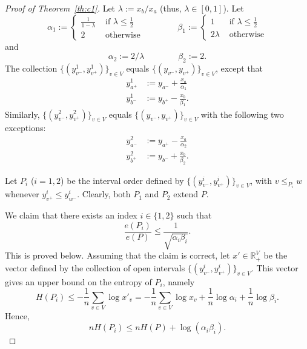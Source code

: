 \documentclass{article} \usepackage{fullpage}
\begin{document}
\begin{proof}[Proof of Theorem~\ref{th:c1}]
Let $\lambda := x_{b} / x_{a}$ (thus, $\lambda \in [0,1]$).
Let
$$
\alpha_{1} := \left\{
\begin{array}{ll}
\frac{1}{1-\lambda} & \textrm{ if } \lambda \leq \frac{1}{2} \\
2 & \textrm{ otherwise}
\end{array}
\right.
\qquad\qquad
\beta_{1} := \left\{
\begin{array}{ll}
1 & \textrm{ if } \lambda \leq \frac{1}{2} \\
2\lambda & \textrm{ otherwise}
\end{array}
\right.
$$
and
$$
\alpha_{2} := 2 / \lambda
\qquad\qquad
\beta_{2} := 2.
$$
The collection $\{(y^{1}_{v^-},y^{1}_{v^+})\}_{v \in V}$ equals
$\{(y_{v^-},y_{v^+})\}_{v \in V}$, except that
\begin{align*}
y^{1}_{a^+} &:= y_{a^-} + \frac{x_{a}}{\alpha_{1}} \\
y^{1}_{b^-} &:= y_{b^+} - \frac{x_{b}}{\beta_{1}}.
\end{align*}
Similarly, $\{(y^{2}_{v^-},y^{2}_{v^+})\}_{v \in V}$ equals
$\{(y_{v^-},y_{v^+})\}_{v \in V}$ with the following two exceptions:
\begin{align*}
y^{2}_{a^-} &:= y_{a^+} - \frac{x_{a}}{\alpha_{2}} \\
y^{2}_{b^+} &:= y_{b^-} + \frac{x_{b}}{\beta_{2}}.
\end{align*}


Let $P_{i}$ ($i=1,2$) be the interval order defined by $\{(y^{i}_{v^-},y^{i}_{v^+})\}_{v \in V}$, with $v \leqslant_{P_i} w$ whenever $y^{i}_{v^+} \leq y^{i}_{w^-}$.
Clearly, both $P_{1}$ and $P_{2}$ extend $P$.

We claim that there exists an index $i\in\{1,2\}$ such that
\begin{equation}
\label{eq:index}
\frac{e(P_{i})}{e(P)} \leq \frac{1}{\sqrt{\alpha_{i}\beta_{i}}}.
\end{equation}
This is proved below. Assuming that the claim is correct, let $x'\in \mathbb{R}_+^V$ be the vector defined by the collection
of open intervals $\{(y^{i}_{v^-},y^{i}_{v^+})\}_{v \in V}$.
This vector gives an upper bound on the entropy of $P_{i}$, namely
$$
H(P_{i}) \leq - \frac{1}{n} \sum_{v \in V} \log x'_v
= - \frac{1}{n} \sum_{v \in V} \log x_v + \frac{1}{n}\log\alpha_{i} + \frac{1}{n}\log\beta_{i}.
$$
Hence,
\begin{equation}
\label{eq:cost}
nH(P_{i}) \leq nH(P) + \log\left( \alpha_{i}\beta_{i} \right).
\end{equation}


\end{proof}
\end{document}
